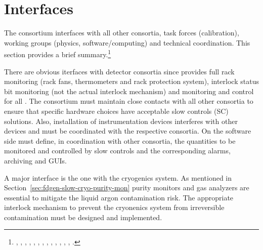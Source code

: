 \section{Interfaces}
\label{sec:fdgen-slow-cryo-intfc}


The  consortium interfaces with all other consortia, task forces (calibration), working groups (physics, software/computing) and technical coordination.
This section provides a brief summary.\footnote{ 
 \cite{bib:docdb6745},
\cite{bib:docdb6991},
\cite{bib:docdb6790},
\cite{bib:docdb6787},
\cite{bib:docdb6784},
\cite{bib:docdb6781},
\cite{bib:docdb6760},
\cite{bib:docdb6679},
\cite{bib:docdb6730},
\cite{bib:docdb7126},
\cite{bib:docdb7099},
\cite{bib:docdb7072},
\cite{bib:docdb7045},
\cite{bib:docdb7018}.}  

There are obvious iterfaces with detector consortia since  provides full rack monitoring (rack fans, thermometers and rack protection system),
interlock status bit monitoring (not the actual interlock mechanism) and monitoring and control for all \pwrsupps. The   consortium must maintain close contacts with all other consortia to ensure that specific hardware choices have acceptable slow controls (SC)  solutions.  
Also, installation of instrumentation devices interferes with other devices and must be coordinated with the respective consortia.  
On the software side  must define, in coordination with other consortia, the quantities to be monitored and controlled by slow controls and the corresponding alarms,
archiving and GUIs. 



A major interface is the one with the cryogenics system. As mentioned in Section~\ref{sec:fdgen-slow-cryo-purity-mon} purity monitors and gas analyzers are essential
to mitigate the liquid argon contamination risk. The appropriate interlock mechanism to prevent the cryonenics system from irreversible contamination
must be designed and implemented. 

